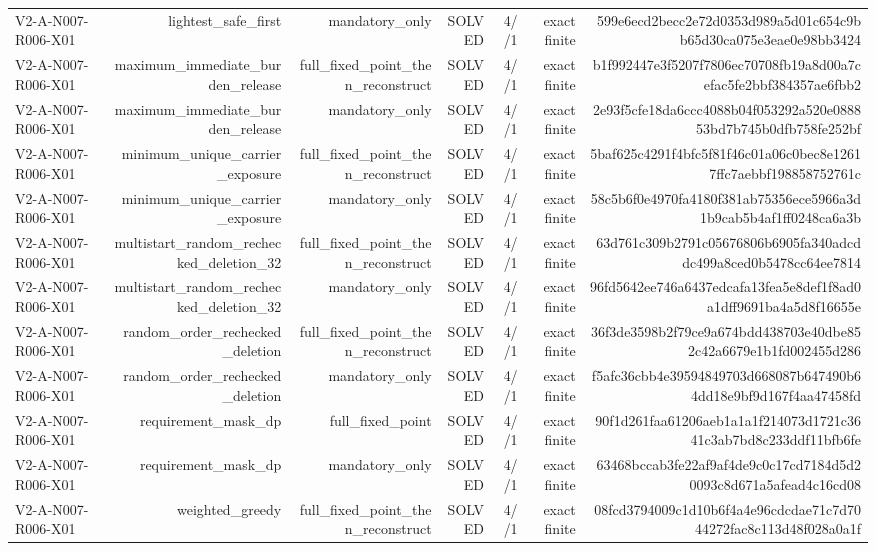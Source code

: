 {\begin{longtable}{lrrrrrr}
V2-A-N007-R006-X01 & lightest\_safe\_first & mandatory\_only & SOLVED & 4//1 & exact finite & 599e6ecd2becc2e72d0353d989a5d01c654c9bb65d30ca075e3eae0e98bb3424 \\
V2-A-N007-R006-X01 & maximum\_immediate\_burden\_release & full\_fixed\_point\_then\_reconstruct & SOLVED & 4//1 & exact finite & b1f992447e3f5207f7806ec70708fb19a8d00a7cefac5fe2bbf384357ae6fbb2 \\
V2-A-N007-R006-X01 & maximum\_immediate\_burden\_release & mandatory\_only & SOLVED & 4//1 & exact finite & 2e93f5cfe18da6ccc4088b04f053292a520e088853bd7b745b0dfb758fe252bf \\
V2-A-N007-R006-X01 & minimum\_unique\_carrier\_exposure & full\_fixed\_point\_then\_reconstruct & SOLVED & 4//1 & exact finite & 5baf625c4291f4bfc5f81f46c01a06c0bec8e12617ffc7aebbf198858752761c \\
V2-A-N007-R006-X01 & minimum\_unique\_carrier\_exposure & mandatory\_only & SOLVED & 4//1 & exact finite & 58c5b6f0e4970fa4180f381ab75356ece5966a3d1b9cab5b4af1ff0248ca6a3b \\
V2-A-N007-R006-X01 & multistart\_random\_rechecked\_deletion\_32 & full\_fixed\_point\_then\_reconstruct & SOLVED & 4//1 & exact finite & 63d761c309b2791c05676806b6905fa340adcddc499a8ced0b5478cc64ee7814 \\
V2-A-N007-R006-X01 & multistart\_random\_rechecked\_deletion\_32 & mandatory\_only & SOLVED & 4//1 & exact finite & 96fd5642ee746a6437edcafa13fea5e8def1f8ad0a1dff9691ba4a5d8f16655e \\
V2-A-N007-R006-X01 & random\_order\_rechecked\_deletion & full\_fixed\_point\_then\_reconstruct & SOLVED & 4//1 & exact finite & 36f3de3598b2f79ce9a674bdd438703e40dbe852c42a6679e1b1fd002455d286 \\
V2-A-N007-R006-X01 & random\_order\_rechecked\_deletion & mandatory\_only & SOLVED & 4//1 & exact finite & f5afc36cbb4e39594849703d668087b647490b64dd18e9bf9d167f4aa47458fd \\
V2-A-N007-R006-X01 & requirement\_mask\_dp & full\_fixed\_point & SOLVED & 4//1 & exact finite & 90f1d261faa61206aeb1a1a1f214073d1721c3641c3ab7bd8c233ddf11bfb6fe \\
V2-A-N007-R006-X01 & requirement\_mask\_dp & mandatory\_only & SOLVED & 4//1 & exact finite & 63468bccab3fe22af9af4de9c0c17cd7184d5d20093c8d671a5afead4c16cd08 \\
V2-A-N007-R006-X01 & weighted\_greedy & full\_fixed\_point\_then\_reconstruct & SOLVED & 4//1 & exact finite & 08fcd3794009c1d10b6f4a4e96cdcdae71c7d7044272fac8c113d48f028a0a1f \\

\end{longtable}}
